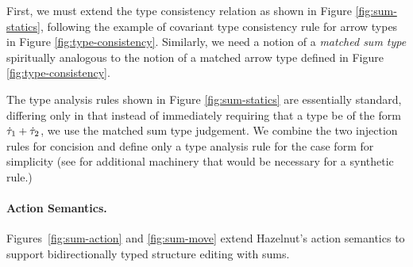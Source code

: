 First, we must extend the type consistency relation as shown in Figure \ref{fig:sum-statics}, following the example of covariant type consistency rule for arrow types in Figure \ref{fig:type-consistency}. Similarly, we need a notion of a \emph{matched sum type} spiritually analogous to the notion of a matched arrow type defined in Figure \ref{fig:type-consistency}.

The type analysis rules shown in Figure \ref{fig:sum-statics} are essentially standard, differing only in that instead of immediately requiring that a type be of the form $\dot{\tau}_1 + \dot{\tau}_2$, we use the matched sum type judgement. We combine the two injection rules for concision and define only a type analysis rule for the case form for simplicity (see \cite{DBLP:conf/popl/CiminiS16} for additional machinery that would be necessary for a synthetic rule.)



%


\paragraph{Action Semantics.}
Figures~\ref{fig:sum-action} and \ref{fig:sum-move} extend Hazelnut's
action semantics to support bidirectionally typed structure editing with sums.
%

